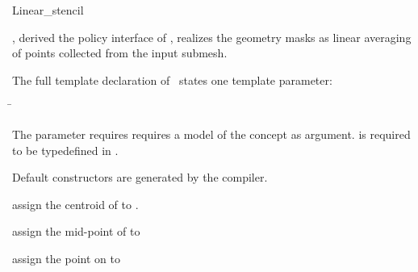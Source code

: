\begin{ccRefClass}{Linear_stencil}

\ccDefinition

\ccClassTemplateName , derived the policy interface of 
, realizes the geometry masks as linear 
averaging of points collected from the input submesh.


\ccParameters

The full template declaration of \ccClassTemplateName\ states one
template parameter:

\begin{tabbing}
 \= 
\end{tabbing}
   
The  parameter requires requires a model of 
the  concept as argument. 
 is required to be typedefined in .

\ccCreation

Default constructors are generated by the compiler.


\ccThree{}{}{}

{assign the centroid of  to .}

{assign the mid-point of  to }

{assign the point on  to }

\ccSeeAlso

\\
\\
\\
\\
\\

\end{ccRefClass}

\ccRefPageEnd



